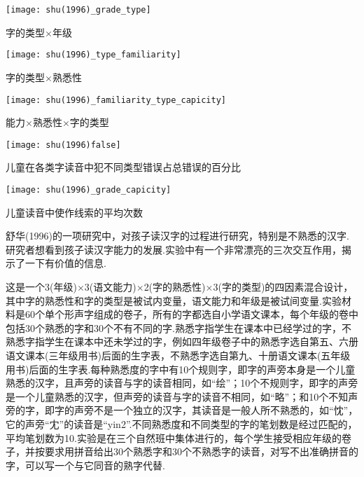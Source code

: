 
\begin{marginfigure}
	\texttt{[image: shu(1996)\_grade\_type]}
	\caption{字的类型$\times$年级}
\end{marginfigure}

\begin{marginfigure}
	\texttt{[image: shu(1996)\_type\_familiarity]}
	\caption{字的类型$\times$熟悉性}
\end{marginfigure}

\begin{marginfigure}
	\texttt{[image: shu(1996)\_familiarity\_type\_capicity]}
	\caption{能力$\times$熟悉性$\times$字的类型}
\end{marginfigure}

\begin{marginfigure}
	\texttt{[image: shu(1996)false]}
	\caption{儿童在各类字读音中犯不同类型错误占总错误的百分比}
\end{marginfigure}


\begin{marginfigure}
	\texttt{[image: shu(1996)\_grade\_capicity]}
	\caption{儿童读音中使作线索的平均次数}
\end{marginfigure}

舒华(1996)的一项研究中，对孩子读汉字的过程进行研究，特别是不熟悉的汉字.研究者想看到孩子读汉字能力的发展.实验中有一个非常漂亮的三次交互作用，揭示了一下有价值的信息.

这是一个3(年级)$\times$3(语文能力)$\times$2(字的熟悉性)$\times$3(字的类型)的四因素混合设计，其中字的熟悉性和字的类型是被试内变量，语文能力和年级是被试间变量.实验材料是60个单个形声字组成的卷子，所有的字都选自小学语文课本，每个年级的卷中包括30个熟悉的字和30个不有不同的字.熟悉字指学生在课本中已经学过的字，不熟悉字指学生在课本中还未学过的字，例如四年级卷子中的熟悉字选自第五、六册语文课本(三年级用书)后面的生字表，不熟悉字选自第九、十册语文课本(五年级用书)后面的生字表.每种熟悉度的字中有10个规则字，即字的声旁本身是一个儿童熟悉的汉字，且声旁的读音与字的读音相同，如“绘”；10个不规则字，即字的声旁是一个儿童熟悉的汉字，但声旁的读音与字的读音不相同，如“略”；和10个不知声旁的字，即字的声旁不是一个独立的汉字，其读音是一般人所不熟悉的，如“忱”，它的声旁“冘”的读音是“yin2”.不同熟悉度和不同类型的字的笔划数是经过匹配的，平均笔划数为10.实验是在三个自然班中集体进行的，每个学生接受相应年级的卷子，并按要求用拼音给出30个熟悉字和30个不熟悉字的读音，对写不出准确拼音的字，可以写一个与它同音的熟字代替. 

